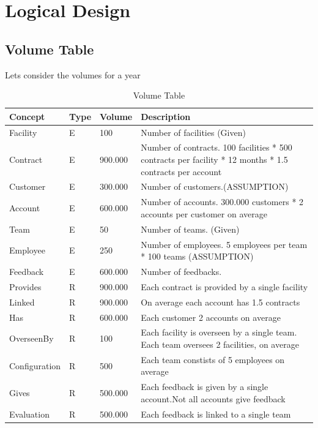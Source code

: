 \section{Logical Design}

\subsection{Volume Table}
Lets consider the volumes for a year

\begin{table}[H]
    \scriptsize
    \renewcommand{\arraystretch}{1.3} %
    \begin{tabularx}{\textwidth}{|X|X|X|X|}
    \hline
    \textbf{Concept}& \textbf{Type}  & \textbf{Volume}    & \textbf{Description}     \\ \hline
    Facility & E & 100 & Number of facilities (Given) \\ \hline
    Contract & E & 900.000 & Number of contracts. 100 facilities * 500 contracts per facility * 12 months * 1.5 contracts per account \\ \hline
    Customer & E & 300.000 & Number of customers.(ASSUMPTION) \\ \hline
    Account & E & 600.000 & Number of accounts. 300.000 customers * 2 accounts per customer on average\\ \hline
    Team & E & 50 & Number of teams. (Given) \\ \hline
    Employee & E & 250 & Number of employees. 5 employees per team * 100 teams (ASSUMPTION) \\ \hline
    Feedback & E & 600.000 & Number of feedbacks.\\ \hline
    Provides & R & 900.000 & Each contract is provided by a single facility \\ \hline
    Linked & R & 900.000 & On average each account has 1.5 contracts \\ \hline
    Has & R & 600.000 & Each customer 2 accounts on average \\ \hline
    OverseenBy & R & 100 & Each facility is overseen by a single team. Each team oversees 2 facilities, on average \\ \hline
    Configuration & R & 500 & Each team constists of 5 employees on average \\ \hline
    Gives & R & 500.000 & Each feedback is given by a single account.Not all accounts give feedback  \\ \hline
    Evaluation & R & 500.000 & Each feedback is linked to a single team\\ \hline
    \end{tabularx}
    \caption{Volume Table}
\end{table}

